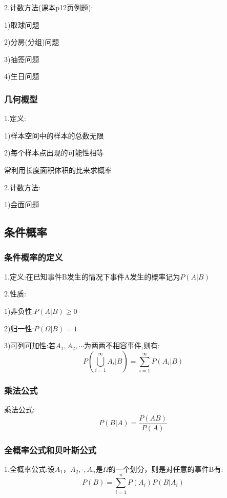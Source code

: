 \documentclass[11pt,twoside,a4paper]{ctexart}
\begin{document}
    2.计数方法(课本p12页例题):
    \begin{minipage}[t]{0.9\linewidth}
        1)取球问题

        2)分房(分组)问题

        3)抽签问题

        4)生日问题

    \end{minipage}

    \subsubsection{几何概型}
    1.定义:
    \begin{minipage}[t]{0.9\linewidth}
        1)样本空间中的样本的总数无限

        2)每个样本点出现的可能性相等

    \end{minipage}

    常利用长度面积体积的比来求概率

    2.计数方法:
    \begin{minipage}[t]{0.9\linewidth}
        1)会面问题

    \end{minipage}
    \subsection{条件概率}
    \subsubsection{条件概率的定义}
    1.定义:在已知事件B发生的情况下事件A发生的概率记为$P(A\vert B) $

    2.性质:
    \begin{minipage}[t]{0.9\linewidth}
        1)非负性:$P(A\vert B) \geq 0 $

        2)归一性:$P(\Omega \vert B) = 1 $

        3)可列可加性:若$A_1 , A_2 , \cdots  $为两两不相容事件,则有:\[P(\bigcup _{i=1}^\infty A_i\vert B) = \sum_{i=1}^\infty P(A_i\vert B)  \]

    \end{minipage}
    \subsubsection{乘法公式}
    乘法公式:\[P(B\vert A) = \frac{P(AB)}{P(A)} \]

    \subsubsection{全概率公式和贝叶斯公式}
    1.全概率公式:设$A_1 ， A_2 , \cdot , A_n $是$\varOmega $的一个划分，则是对任意的事件B有:
    \[P(B) = \sum_{i=1}^n {P(A_i)P(B\vert A_i)  }  \] 
\end{document}

